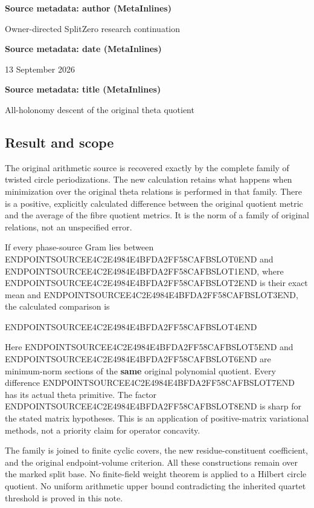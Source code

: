 \textbf{Source metadata: author (MetaInlines)}

Owner-directed SplitZero research continuation

\textbf{Source metadata: date (MetaInlines)}

13 September 2026

\textbf{Source metadata: title (MetaInlines)}

All-holonomy descent of the original theta quotient

\subsection{Result and scope}\label{endpoint-holonomy_original--result-and-scope}

The original arithmetic source is recovered exactly by the complete family of twisted circle periodizations. The new calculation retains what happens when minimization over the original theta relations is performed in that family. There is a positive, explicitly calculated difference between the original quotient metric and the average of the fibre quotient metrics. It is the norm of a family of original relations, not an unspecified error.

If every phase-source Gram lies between ENDPOINTSOURCEE4C2E4984E4BFDA2FF58CAFBSLOT0END and ENDPOINTSOURCEE4C2E4984E4BFDA2FF58CAFBSLOT1END, where ENDPOINTSOURCEE4C2E4984E4BFDA2FF58CAFBSLOT2END is their exact mean and ENDPOINTSOURCEE4C2E4984E4BFDA2FF58CAFBSLOT3END, the calculated comparison is

ENDPOINTSOURCEE4C2E4984E4BFDA2FF58CAFBSLOT4END

Here ENDPOINTSOURCEE4C2E4984E4BFDA2FF58CAFBSLOT5END and ENDPOINTSOURCEE4C2E4984E4BFDA2FF58CAFBSLOT6END are minimum-norm sections of the \textbf{same} original polynomial quotient. Every difference ENDPOINTSOURCEE4C2E4984E4BFDA2FF58CAFBSLOT7END has its actual theta primitive. The factor ENDPOINTSOURCEE4C2E4984E4BFDA2FF58CAFBSLOT8END is sharp for the stated matrix hypotheses. This is an application of positive-matrix variational methods, not a priority claim for operator concavity.

The family is joined to finite cyclic covers, the new residue-constituent coefficient, and the original endpoint-volume criterion. All these constructions remain over the marked split base. No finite-field weight theorem is applied to a Hilbert circle quotient. No uniform arithmetic upper bound contradicting the inherited quartet threshold is proved in this note.

